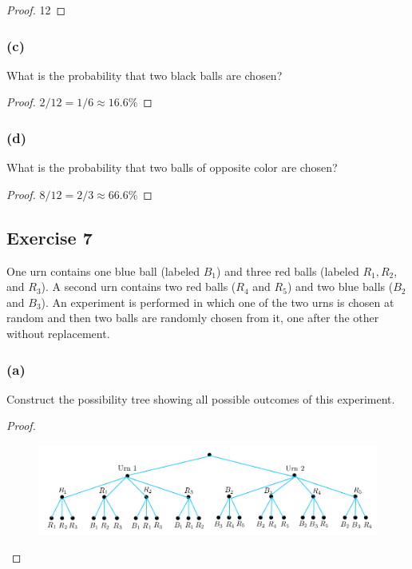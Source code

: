 \documentclass[14pt]{extarticle}
\begin{document}
\begin{proof}
12
\end{proof}

\subsubsection{(c)}
What is the probability that two black balls are chosen?

\begin{proof}
\(2/12 = 1/6 \approx 16.6\%\)
\end{proof}

\subsubsection{(d)}
What is the probability that two balls of opposite color are chosen?

\begin{proof}
\(8/12 = 2/3 \approx 66.6\%\)
\end{proof}

\subsection{Exercise 7}
One urn contains one blue ball (labeled \(B_1\)) and three red balls (labeled \(R_1, R_2\), and \(R_3\)). A second urn 
contains two red balls (\(R_4\) and \(R_5\)) and two blue balls (\(B_2\) and \(B_3\)). An experiment is performed in 
which one of the two urns is chosen at random and then two balls are randomly chosen from it, one after the other 
without replacement.

\subsubsection{(a)}
Construct the possibility tree showing all possible outcomes of this experiment.

\begin{proof}
\begin{figure}[ht!]
\centering
\includegraphics[scale=0.5]{../images/9.2.7.a.png}
\end{figure}
\end{proof}
\end{document}
